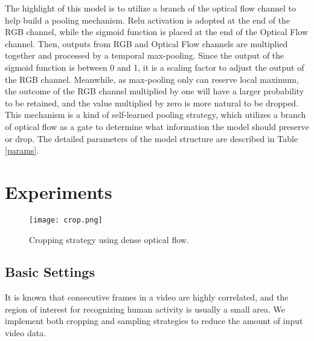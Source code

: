 \documentclass[a4paper,conference]{IEEEtran}
\begin{document}
The highlight of this model is to utilize a branch of the optical flow channel to help build a pooling mechanism. Relu activation is adopted at the end of the RGB channel, while the sigmoid function is placed at the end of the Optical Flow channel. Then, outputs from RGB and Optical Flow channels are multiplied together and processed by a temporal max-pooling. Since the output of the sigmoid function is between 0 and 1, it is a scaling factor to adjust the output of the RGB channel. Meanwhile, as max-pooling only can reserve local maximum, the outcome of the RGB channel multiplied by one will have a larger probability to be retained, and the value multiplied by zero is more natural to be dropped. This mechanism is a kind of self-learned pooling strategy, which utilizes a branch of optical flow as a gate to determine what information the model should preserve or drop. The detailed parameters of the model structure are described in Table \ref{params}.

\section{Experiments}

\begin{figure}[t]
  \centering
  \texttt{[image: crop.png]}
  \caption{Cropping strategy using dense optical flow.}
  \label{Crop}
\end{figure}


\subsection{Basic Settings}
It is known that consecutive frames in a video are highly correlated, and the region of interest for recognizing human activity is usually a small area. We implement both cropping and sampling strategies to reduce the amount of input video data.
\end{document}
